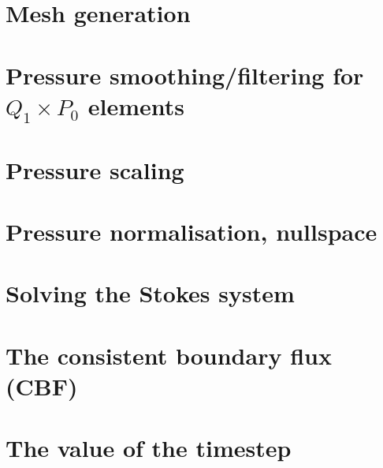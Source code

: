 \section{Mesh generation} \label{sec:meshes}  %
\newpage %
\section{Pressure smoothing/filtering for $Q_1\times P_0$ elements \label{psmoothing}} 
\newpage %
\section{Pressure scaling \label{pscaling}}  %
\newpage %
\section{Pressure normalisation, nullspace\label{ss_pnorm}}  %
\newpage %
\section{Solving the Stokes system \label{sec:solvers}}  %
\newpage %
\section{The consistent boundary flux (CBF) \label{ss:cbf}}  %
\newpage %
\section{The value of the timestep}\label{ss:cfl}  %
\newpage %
